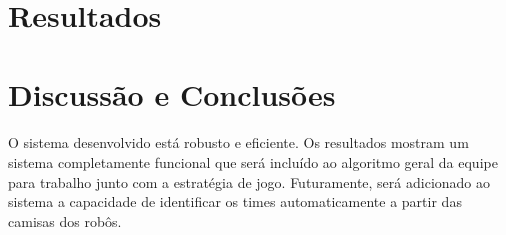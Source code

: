 \documentclass[conference, harvard, brazil, english]{sbatex}
\begin{document}
	\section{Resultados}
			
	\section{Discussão e Conclusões}
	\paragraph{}
	O sistema desenvolvido está robusto e eficiente. Os resultados mostram um sistema completamente funcional que será incluído ao algoritmo geral da equipe para trabalho junto com a estratégia de jogo. Futuramente, será adicionado ao sistema a capacidade de identificar os times automaticamente a partir das camisas dos robôs.
\end{document}
